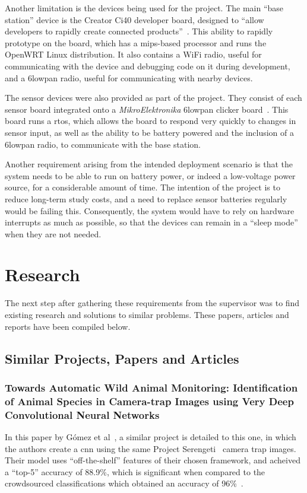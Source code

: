 Another limitation is the devices being used for the project. The main ``base
station'' device is the Creator Ci40 developer board, designed to ``allow
developers to rapidly create connected products''~\cite{creatorci40}. This
ability to rapidly prototype on the board, which has a \acrshort{mips}-based
processor and runs the OpenWRT Linux distribution. It also contains a WiFi
radio, useful for communicating with the device and debugging code on it
during development, and a \gls{6lowpan} radio, useful for communicating with
nearby devices.

The sensor devices were also provided as part of the project. They consist of
each sensor board integrated onto a \textit{MikroElektronika} \gls{6lowpan}
clicker board~\cite{mikroeclick}. This board runs a \acrfull{rtos}, which
allows the board to respond very quickly to changes in sensor input, as well
as the ability to be battery powered and the inclusion of a \gls{6lowpan}
radio, to communicate with the base station.

Another requirement arising from the intended deployment scenario is that the
system needs to be able to run on battery power, or indeed a low-voltage
power source, for a considerable amount of time. The intention of the project
is to reduce long-term study costs, and a need to replace sensor batteries
regularly would be failing this. Consequently, the system would have to rely
on hardware interrupts as much as possible, so that the devices can remain in
a ``sleep mode'' when they are not needed.


\section{Research}

The next step after gathering these requirements from the supervisor was to
find existing research and solutions to similar problems. These papers,
articles and reports have been compiled below.

\subsection{Similar Projects, Papers and Articles}

\subsubsection{Towards Automatic Wild Animal Monitoring: Identification of
Animal Species in Camera-trap Images using Very Deep Convolutional Neural
Networks}
In this paper by Gómez et al~\cite{gomez2016towards}, a similar project is
detailed to this one, in which the authors create a \acrlong{cnn} using the
same Project Serengeti~\cite{swanson2015snapshot} camera trap images. Their
model uses ``off-the-shelf'' features of their chosen framework, and acheived
a ``top-5'' accuracy of 88.9\%, which is significant when compared to the
crowdsourced classifications which obtained an accuracy of
96\%~\cite{swanson2015snapshot}.

